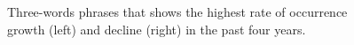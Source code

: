 \documentclass[geosciences,article,submit,moreauthors,pdftex]{Definitions/mdpi}
\begin{document}
\begin{figure}[ht!]

\begin{minipage}{0.49\linewidth}
\end{minipage}
\hfill
\begin{minipage}{0.49\linewidth}
\end{minipage}

\caption{Three-words phrases that shows the highest rate of occurrence growth (left)  and decline (right) in the past four years.}
\label{trigrams}
\end{figure}
\end{document}
